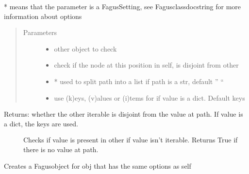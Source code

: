 \documentclass[a4paper,10pt,english]{sphinxmanual}
\begin{document}
\begin{fulllineitems}
\begin{fulllineitems}
\sphinxAtStartPar
* means that the parameter is a Fagus\sphinxhyphen{}Setting, see Fagus\sphinxhyphen{}class\sphinxhyphen{}docstring for more information about options
\begin{quote}\begin{description}
\item[{Parameters}] \leavevmode\begin{itemize}
\item {}
\sphinxAtStartPar
{} \textendash{} other object to check

\item {}
\sphinxAtStartPar
{} \textendash{} check if the node at this position in self, is disjoint from other

\item {}
\sphinxAtStartPar
{} \textendash{} * used to split path into a list if path is a str, default ” “

\item {}
\sphinxAtStartPar
{} \textendash{} use (k)eys, (v)alues or (i)tems for if value is a dict. Default keys

\end{itemize}

\end{description}\end{quote}
\begin{description}
\item[{Returns: whether the other iterable is disjoint from the value at path. If value is a dict, the keys are used.}] \leavevmode
\sphinxAtStartPar
Checks if value is present in other if value isn’t iterable. Returns True if there is no value at path.

\end{description}

\end{fulllineitems}


\begin{fulllineitems}
\label{\detokenize{fagus.fagus:fagus.fagus.Fagus.child}}
\pysigstartsignatures
{}
\pysigstopsignatures
\sphinxAtStartPar
Creates a Fagus\sphinxhyphen{}object for obj that has the same options as self


\end{fulllineitems}
\end{fulllineitems}
\end{document}
